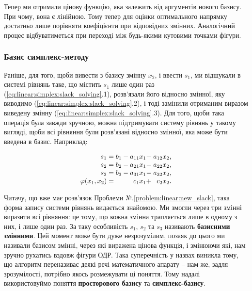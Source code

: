 \documentclass[\main/book.tex]{subfiles}
\begin{document}
Тепер ми отримали цінову функцію, яка залежить від аргументів нового базису. При чому, вона є лінійною. Тому тепер для оцінки оптимального напрямку достатньо лише порівняти коефіцієнти при відповідних змінних. Аналогічний процес відбуватиметься при переході між будь-якими кутовими точками фігури.

\subsubsection{Базис симплекс-методу}

Раніше, для того, щоби вивести з базису змінну $x_2$, і ввести $s_1$, ми відшукали в системі рівнянь таке, що містить $s_1$ лише один раз (\ref{eq:linear:simplex:slack_solving}.1), розв'язали його відносно змінної, яку виводимо (\ref{eq:linear:simplex:slack_solving}.2), і тоді замінили отриманим виразом виведену змінну (\ref{eq:linear:simplex:slack_solving}.3). Для того, щоби така операція була завжди зручною, можна підтримувати систему рівнянь у такому вигляді, щоби всі рівняння були розв'язані відносно змінної, яка може бути введена в базис. Наприклад:

\begin{equation}
 \begin{array}{r@{\;}r@{\;}r}
  s_1               = & b_1 - a_{11} x_1 - & a_{12} x_2 \text{,} \\
  s_2               = & b_2 - a_{21} x_1 - & a_{22} x_2 \text{,} \\
  s_3               = & b_3 - a_{31} x_1 - & a_{32} x_2 \text{,} \\
  \varphi(x_1, x_2) = &          c_1 x_1 + &    c_2 x_2 \text{.}
 \end{array}
 \label{eq:linear:simplex:canonical_slack_2dim3eq}
\end{equation}

Читачу, що вже має розв'язок Проблеми №.\ref{problem:linear:new_slack}, така форма запису системи рівнянь видається знайомою. Ми змогли через три змінні виразити всі рівняння: це тому, що кожна змінна трапляється лише в одному з них, і лише один раз. За таку особливість $s_1$, $s_2$ та $s_3$ називають \textbf{базисними змінними}. Цей момент може бути дуже незрозумілим, позаяк до цього ми називали \flqq{}базисом\frqq{} змінні, через які виражена цінова функція, і змінюючи які, нам зручно рухатись вздовж фігури ОДР. Така суперечність у назвах виникла тому, що алгоритм переназиває деякі речі математичного апарату -- нам же, задля зрозумілості, потрібно якось розмежувати ці поняття. Тому надалі використовуймо поняття \textbf{просторового базису} та \textbf{симплекс-базису}.
\end{document}
